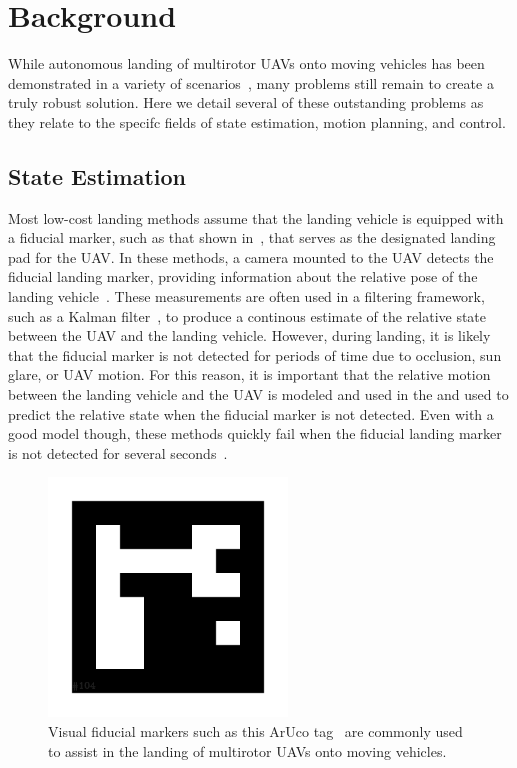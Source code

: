 \section{Background}

While autonomous landing of multirotor UAVs onto moving vehicles has been
demonstrated in a variety of scenarios~\cite{wynn2019visual}, many problems still remain to
create a truly robust solution. Here we detail several of these outstanding
problems as they relate to the specifc fields of state estimation, motion
planning, and control.

\subsection{State Estimation}
Most low-cost landing methods assume that the landing vehicle is equipped with a
fiducial marker, such as that shown in~, that serves as
the designated landing pad for the UAV.
In these methods, a camera mounted to the UAV detects the fiducial landing marker, providing
information about the relative pose of the landing
vehicle~\cite{borowczyk2017autonomous}. These measurements are often used in a
filtering framework, such as a Kalman filter~\cite{kalman}, to produce a
continous estimate of the relative state between the UAV and the landing
vehicle. However, during landing, it is likely
that the fiducial marker is not detected for periods of time due to occlusion,
sun glare, or UAV motion. For this reason, it is important that the relative
motion between the landing vehicle and the UAV is modeled and used in the  and used to predict
the relative state when the fiducial marker is not detected.
Even with a good model though,
these methods quickly fail when the fiducial landing
marker is not detected for several seconds~\cite{ling2014precision}.

\begin{figure}[h]
  \centering
  \includegraphics[width=2.5in]{figures/aruco_104.png}
  \caption[Visual Fiducial Landing Marker]{Visual fiducial markers such as this
    ArUco tag~\cite{garrido2016generation} are commonly used to assist in the
  landing of multirotor UAVs onto moving vehicles.}
  \label{fig:aruco_tag}
\end{figure}

